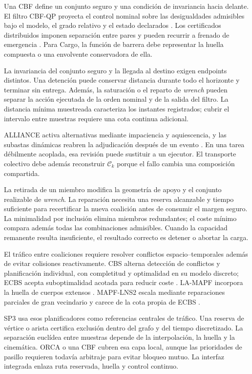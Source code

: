 Una CBF define un conjunto seguro y una condición de invariancia hacia delante. El filtro CBF-QP proyecta el control nominal sobre las desigualdades admisibles bajo el modelo, el grado relativo y el estado declarados \parencite{ames2017cbf}. Los certificados distribuidos imponen separación entre pares y pueden recurrir a frenado de emergencia \parencite{wang2017barrier}. Para Cargo, la función de barrera debe representar la huella compuesta o una envolvente conservadora de ella.

La invariancia del conjunto seguro y la llegada al destino exigen endpoints distintos. Una detención puede conservar distancia durante todo el horizonte y terminar sin entrega. Además, la saturación o el reparto de \emph{wrench} pueden separar la acción ejecutada de la orden nominal y de la salida del filtro. La distancia mínima muestreada caracteriza los instantes registrados; cubrir el intervalo entre muestras requiere una cota continua adicional.

ALLIANCE activa alternativas mediante impaciencia y aquiescencia, y las subastas dinámicas reabren la adjudicación después de un evento \parencite{parker1998alliance,nanjanath2006dynamicAuctions}. En una tarea débilmente acoplada, esa revisión puede sustituir a un ejecutor. El transporte colectivo debe además reconstruir \(\mathcal C_k\) porque el fallo cambia una composición compartida.

La retirada de un miembro modifica la geometría de apoyo y el conjunto realizable de \emph{wrench}. La reparación necesita una reserva alcanzable y tiempo suficiente para recertificar la nueva coalición antes de consumir el margen seguro. La minimalidad por inclusión elimina miembros redundantes; el coste mínimo compara además todas las combinaciones admisibles. Cuando la capacidad remanente resulta insuficiente, el resultado correcto es detener o abortar la carga.

El tráfico entre coaliciones requiere resolver conflictos espacio--temporales además de evitar colisiones reactivamente. CBS alterna detección de conflictos y planificación individual, con completitud y optimalidad en su modelo discreto; ECBS acepta suboptimalidad acotada para reducir coste \parencite{sharon2015cbs,barer2014ecbs}. LA-MAPF incorpora la huella de cuerpos extensos \parencite{li2019largeAgentMapf}. MAPF-LNS2 escala mediante reparaciones parciales de gran vecindario y carece de la cota propia de ECBS \parencite{li2022mapfLns2}.

SP3 usa esos planificadores como referencias centrales de tráfico. Una reserva de vértice o arista certifica exclusión dentro del grafo y del tiempo discretizado. La separación euclídea entre muestras depende de la interpolación, la huella y la cinemática. ORCA o una CBF cubren esa capa local, aunque las prioridades de pasillo requieren todavía arbitraje para evitar bloqueo mutuo. La interfaz integrada enlaza ruta reservada, huella y control continuo.

